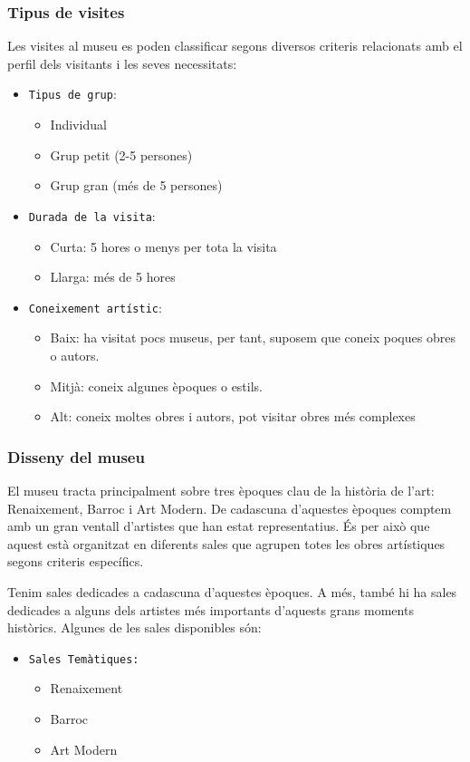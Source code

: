 \documentclass[a4paper]{article}
\begin{document}
	\subsubsection{Tipus de visites}
	Les visites al museu es poden classificar segons diversos criteris relacionats amb el perfil dels visitants i les seves necessitats:
	\begin{itemize}
		\item \texttt{Tipus de grup}:
		\begin{itemize}
			\item Individual
			\item Grup petit (2-5 persones)
			\item Grup gran (més de 5 persones)
		\end{itemize}
		\item \texttt{Durada de la visita}:
		\begin{itemize}
			\item Curta: 5 hores o menys per tota la visita
			\item Llarga: més de 5 hores
		\end{itemize}
		\item \texttt{Coneixement artístic}:
		\begin{itemize}
			\item Baix: ha visitat pocs museus, per tant, suposem que coneix poques obres o autors.
			\item Mitjà: coneix algunes èpoques o estils.
			\item Alt: coneix moltes obres i autors, pot visitar obres més complexes
		\end{itemize}
	\end{itemize}
	
	\subsubsection{Disseny del museu}
	El museu tracta principalment sobre tres èpoques clau de la història de l'art: {Renaixement, Barroc i Art Modern}. De cadascuna d'aquestes èpoques comptem amb un gran ventall d'artistes que han estat representatius. És per això que aquest està organitzat en diferents sales que agrupen totes les obres artístiques segons criteris específics.
	
	Tenim sales dedicades a cadascuna d'aquestes èpoques. A més, també hi ha sales dedicades a alguns dels artistes més importants d'aquests grans moments històrics. Algunes de les sales disponibles són:
	
	\begin{itemize}
		\item \texttt{Sales Temàtiques: } 
		\begin{itemize}
			\item Renaixement
			\item Barroc
			\item Art Modern
		\end{itemize}
	\end{itemize}
	
\end{document}
